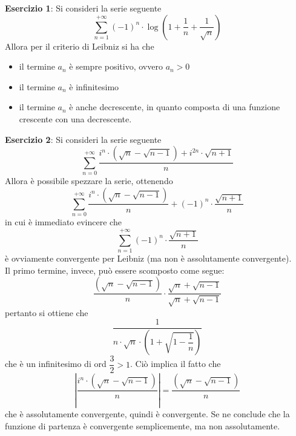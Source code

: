 \documentclass[a4paper]{extarticle}
\begin{document}
\vspace{1em}
\noindent
\textbf{Esercizio 1}: Si consideri la serie seguente
\[\sum_{n=1}^{+\infty} (-1)^n \cdot \log \left(1+\frac{1}{n}+\frac{1}{\sqrt{n}}\right)\]
Allora per il criterio di Leibniz si ha che
\begin{itemize}
    \item il termine $a_n$ è sempre positivo, ovvero $a_n>0$
    \item il termine $a_n$ è infinitesimo
    \item il termine $a_n$ è anche decrescente, in quanto composta di una funzione crescente con una decrescente.
\end{itemize}

\vspace{1em}
\noindent
\textbf{Esercizio 2}: Si consideri la serie seguente
\[\sum_{n=0}^{+\infty} \frac{i^n \cdot \left(\sqrt{n} - \sqrt{n-1}\right) + i^{2n} \cdot \sqrt{n+1}}{n}\]
Allora è possibile spezzare la serie, ottenendo
\[\sum_{n=0}^{+\infty} \frac{i^n \cdot \left(\sqrt{n} - \sqrt{n-1}\right)}{n} + (-1)^n \cdot \frac{\sqrt{n+1}}{n}\]
in cui è immediato evincere che
\[\sum_{n=1}^{+\infty} (-1)^n \cdot \frac{\sqrt{n+1}}{n}\]
è ovviamente convergente per Leibniz (ma non è assolutamente convergente).\\
Il primo termine, invece, può essere scomposto come segue:
\[\frac{\left(\sqrt{n} - \sqrt{n-1}\right)}{n} \cdot \frac{\sqrt{n} + \sqrt{n-1}}{\sqrt{n} + \sqrt{n-1}}\]
pertanto si ottiene che
\[\dfrac{1}{n \cdot \sqrt{n} \cdot \left(1+\sqrt{1-\dfrac{1}{n}} \right)}\]
che è un infinitesimo di ord $\dfrac{3}{2}>1$. Ciò implica il fatto che
\[\left \vert \frac{i^n \cdot \left(\sqrt{n} - \sqrt{n-1}\right)}{n} \right \vert =  \frac{\left(\sqrt{n} - \sqrt{n-1}\right)}{n}\]
che è assolutamente convergente, quindi è convergente. Se ne conclude che la funzione di partenza è convergente semplicemente, ma non assolutamente.
\end{document}
